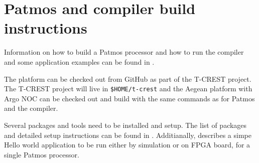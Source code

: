 \documentclass[a4paper,fontsize=10pt,twoside,DIV15,BCOR12mm,headinclude=true,footinclude=false,pagesize,bibtotoc]{scrbook}
\newcommand{\code}[1]{{\texttt{#1}}}
\begin{document}
\section{Patmos and compiler build instructions}

Information on how to build a Patmos processor and how to run the compiler and some application examples
can be found in \cite{patmos-handbook}. 


The platform can be checked out from GitHub as part of the T-CREST project.
The T-CREST project will live in \code{\$HOME/t-crest} and the Aegean platform with Argo NOC
can be checked out and build with the same commands as for Patmos and the compiler.%



Several packages and tools need to be installed and setup. The list of packages 
and detailed setup instructions can be found in \cite{patmos-handbook}.
Additianally, \cite{patmos-handbook} describes a simpe Hello world application 
to be run either by simulation or on FPGA board, for a single Patmos processor.
\end{document}
